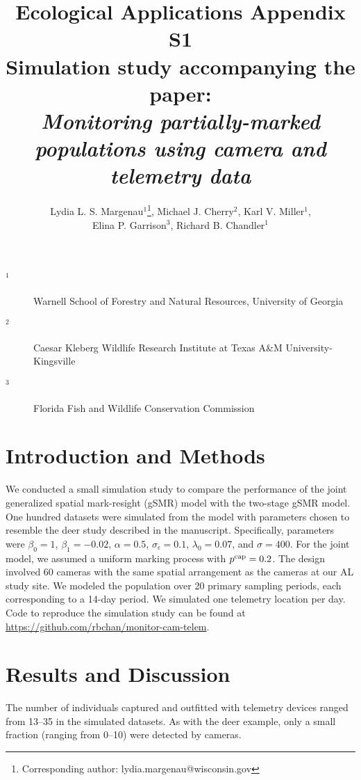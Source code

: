 \documentclass[12pt]{article}
\title{Ecological Applications Appendix S1 \\ Simulation study accompanying the paper: \\ \it Monitoring partially-marked populations using camera and telemetry data }
\author{Lydia L. S. Margenau$^{1}$\footnote{Corresponding author: lydia.margenau@wisconsin.gov}, Michael J. Cherry$^2$,  Karl V. Miller$^1$, \\ Elina P. Garrison$^3$, Richard B. Chandler$^1$}
\begin{document}
\maketitle

\vspace{12pt}

\begin{description}%
\item[$^1$] Warnell School of Forestry and Natural Resources, University of Georgia %
\item[$^2$] Caesar Kleberg Wildlife Research Institute at Texas A\&M University-Kingsville %
\item[$^3$] Florida Fish and Wildlife Conservation Commission %
\end{description}

\clearpage

\section*{Introduction and Methods}

We conducted a small simulation study to compare the performance of
the joint generalized spatial mark-resight (gSMR) model with the
two-stage gSMR model. One hundred datasets were simulated from the
model with parameters chosen to resemble the deer study described in
the manuscript. Specifically, parameters were $\beta_0=1$,
$\beta_1=-0.02$, $\alpha=0.5$, $\sigma_{\epsilon}=0.1$,
$\lambda_0=0.07$, and $\sigma=400$. For the joint model, we assumed a
uniform marking process with $p^{\rm cap}=0.2$. The design involved 60
cameras with the same spatial arrangement as the cameras at our AL
study site. We modeled the population over 20 primary sampling
periods, each corresponding to a 14-day period. We simulated one
telemetry location per day. Code to reproduce the simulation study can
be found at \url{https://github.com/rbchan/monitor-cam-telem}.


\section*{Results and Discussion}

The number of individuals captured and outfitted with telemetry
devices ranged from 13--35 in the simulated datasets. As with the deer
example, only a small fraction (ranging from 0--10) were detected by
cameras. 
\end{document}

